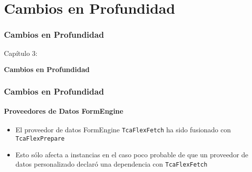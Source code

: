%

\section{Cambios en Profundidad}
\begin{frame}[fragile]
	\frametitle{Cambios en Profundidad}

	\begin{center}\huge{Capítulo 3:}\end{center}
	\begin{center}\huge{\color{typo3darkgrey}\textbf{Cambios en Profundidad}}\end{center}

\end{frame}


\begin{frame}[fragile]
	\frametitle{Cambios en Profundidad}
	\framesubtitle{Proveedores de Datos FormEngine}

	\begin{itemize}
		\item El proveedor de datos FormEngine \texttt{TcaFlexFetch} ha sido fusionado con \texttt{TcaFlexPrepare}
		\item Esto sólo afecta a instancias en el caso poco probable de que un proveedor de datos personalizado declaró una
			dependencia con \texttt{TcaFlexFetch}
	\end{itemize}

\end{frame}

